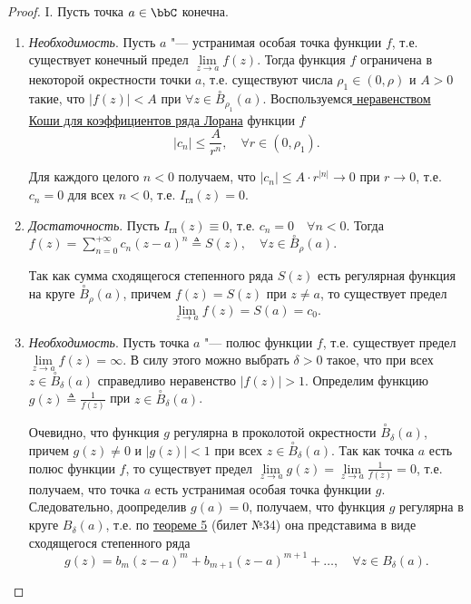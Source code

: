 \begin{proof}

I. Пусть точка $a \in \bbC$ конечна.

\begin{enumerate}[wide, labelwidth=!, labelindent=\parindent]

\item \textit{Необходимость}. Пусть $a$ "--- устранимая особая точка функции $f$, т.е. существует конечный предел $\lim\limits_{z \to a} f(z)$. Тогда функция $f$ ограничена в некоторой окрестности точки $a$, т.е. существуют числа $\rho_1 \in (0, \rho)$ и $A > 0$ такие, что $|f(z)| < A$ при $\forall z \in \overset{\circ}{B}_{\rho_1}(a)$. Воспользуемся\hyperref[ch35.1cons3]{ неравенством Коши для коэффициентов ряда Лорана} функции $f$
$$
|c_n| \le \frac{A}{r^n}, \quad \forall r \in (0, \rho_1).
$$

Для каждого целого $n < 0$ получаем, что $|c_n| \le A \cdot r^{|n|} \to 0$ при $r \to 0$, т.е. $c_n = 0$ для всех $n < 0$, т.е. $I_{\text{гл}}(z) = 0$.

\item \textit{Достаточность}. Пусть $I_{\text{гл}}(z) \equiv 0$, т.е. $c_n = 0 \quad \forall n < 0$. Тогда $f(z) = \sum\limits_{n = 0}^{+\infty} c_n (z - a)^n \triangleq S(z), \quad \forall z \in \overset{\circ}{B}_{\rho}(a)$.

Так как сумма сходящегося степенного ряда $S(z)$ есть регулярная функция на круге $\overset{\circ}{B}_{\rho}(a)$, причем $f(z) = S(z)$ при $z \not= a$, то существует предел
$$
\lim_{z \to a} f(z) = S(a) = c_0.
$$

\item \textit{Необходимость}. Пусть точка $a$ "--- полюс функции $f$, т.е. существует предел $\lim\limits_{z \to a} f(z) = \infty$. В силу этого можно выбрать $\delta > 0$ такое, что при всех $z \in \overset{\circ}{B}_{\delta}(a)$ справедливо неравенство $|f(z)| > 1$. Определим функцию $g(z)\triangleq\frac{1}{f(z)}$ при $z \in \overset{\circ}{B}_{\delta}(a)$.

Очевидно, что функция $g$ регулярна в проколотой окрестности $\overset{\circ}{B}_{\delta}(a)$, причем $g(z) \not= 0$ и $|g(z)| < 1$ при всех $z \in \overset{\circ}{B}_{\delta}(a)$. Так как точка $a$ есть полюс функции $f$, то существует предел $\lim\limits_{z \to a} g(z) = \lim\limits_{z \to a} \frac{1}{f(z)} = 0$, т.е. получаем, что точка $a$ есть устранимая особая точка функции $g$. Следовательно, доопределив $g(a) = 0$, получаем, что функция $g$ регулярна в круге $B_{\delta}(a)$, т.е. по \hyperref[abc29]{теореме 5} (билет №34) она представима в виде сходящегося степенного ряда
\begin{equation} \label{ch35.2eq3}
g(z) = b_m (z - a)^m + b_{m + 1} (z - a)^{m + 1} + \ldots, \quad \forall z \in B_\delta(a).
\end{equation}


\end{enumerate}
\end{proof}
